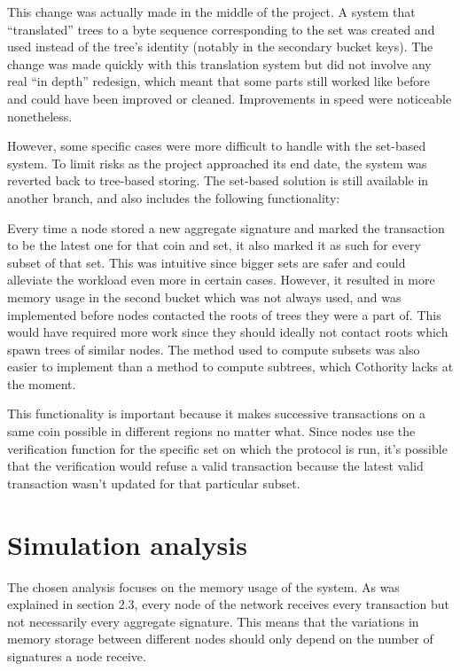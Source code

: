 \documentclass[11pt, a4paper, twoside, openright]{article}
\begin{document}
This change was actually made in the middle of the project. A system that ``translated'' trees to a byte sequence corresponding to the set was created and used instead of the tree's identity (notably in the secondary bucket keys). The change was made quickly with this translation system but did not involve any real ``in depth'' redesign, which meant that some parts still worked like before and could have been improved or cleaned. Improvements in speed were noticeable nonetheless.

However, some specific cases were more difficult to handle with the set-based system. To limit risks as the project approached its end date, the system was reverted back to tree-based storing. The set-based solution is still available in another branch, and also includes the following functionality:

Every time a node stored a new aggregate signature and marked the transaction to be the latest one for that coin and set, it also marked it as such for every subset of that set. This was intuitive since bigger sets are safer and could alleviate the workload even more in certain cases. However, it resulted in more memory usage in the second bucket which was not always used, and was implemented before nodes contacted the roots of trees they were a part of. This would have required more work since they should ideally not contact roots which spawn trees of similar nodes. The method used to compute subsets was also easier to implement than a method to compute subtrees, which Cothority lacks at the moment.

This functionality is important because it makes successive transactions on a same coin possible in different regions no matter what. Since nodes use the verification function for the specific set on which the protocol is run, it's possible that the verification would refuse a valid transaction because the latest valid transaction wasn't updated for that particular subset.





\section{Simulation analysis}
The chosen analysis focuses on the memory usage of the system. As was explained in section 2.3, every node of the network receives every transaction but not necessarily every aggregate signature. This means that the variations in memory storage between different nodes should only depend on the number of signatures a node receive. 
\end{document}
